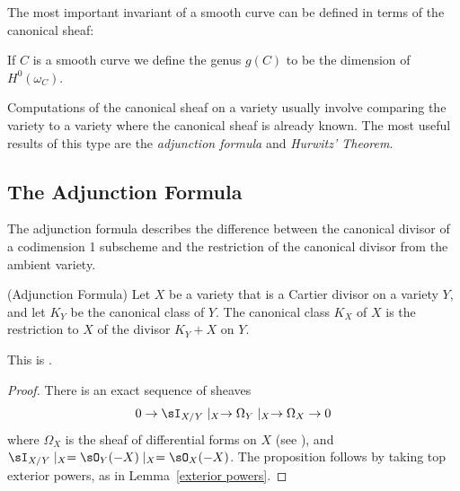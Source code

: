 
The most important invariant of a smooth curve can be defined in terms of the canonical sheaf:

\begin{definition}
If $C$ is a smooth curve we define the genus $g(C)$ to be the dimension of $H^0(\omega_C)$.
\end{definition}

Computations of the canonical sheaf on a variety usually involve comparing the variety to a variety where the canonical sheaf is already known. The most useful results of this type are  the \emph{adjunction formula}
and \emph{Hurwitz' Theorem}. 

\subsection{The Adjunction Formula}\label{Adjunction Formula}

The adjunction formula describes the difference between the canonical divisor of
a codimension 1 subscheme and the restriction of the canonical divisor from the ambient variety.

\begin{proposition}\label{adjunction}(Adjunction Formula)
 Let $X$ be a variety that is a Cartier divisor on a variety $Y$, and let $K_{Y}$ be the canonical class of $Y$. The canonical class $K_X$ of $X$ is
 the restriction to $X$ of the divisor $K_{Y}+X$ on $Y$.
\end{proposition}
This is \cite[Proposition 8.20]{H}.
\begin{proof}
 There is an exact sequence of sheaves
 $$
0\to  \sI_{X/Y}\mid_{X} \to \Omega_{Y}\mid _{X} \to \Omega_{X} \to 0
 $$
 where $\Omega_{X}$ is the sheaf of differential forms on $X$ (see \cite[Proposition 16.3]{Eisenbud95}), and
$ \sI_{X/Y}\mid_{X} = \sO_{Y}(-X)\mid_{X} = \sO_{X}(-X)$. The proposition follows by taking top exterior powers, 
as in Lemma~\ref{exterior powers}.\end{proof}

